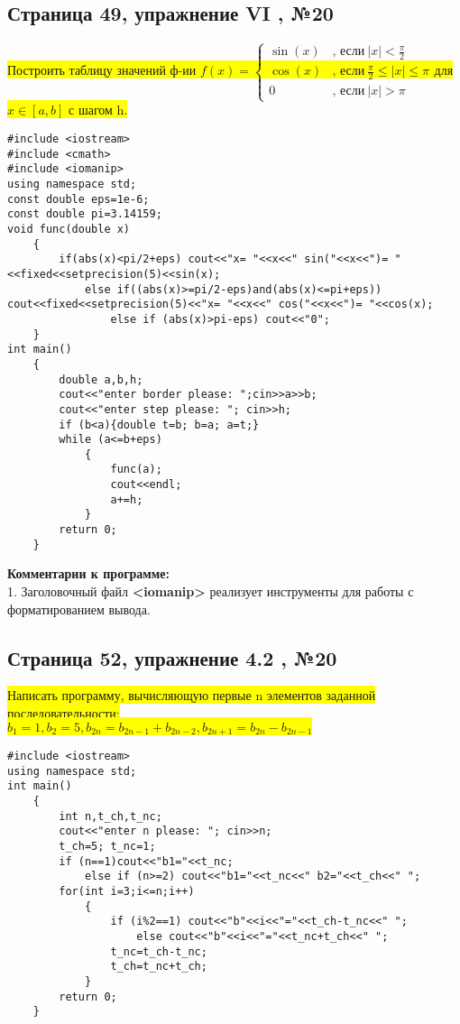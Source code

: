 \documentclass[11pt]{article}
\begin{document}
\begin{flushleft}
\newpage
\begin{center}
\section{Страница 49, упражнение VI , №20}
\colorbox{yellow}{Построить таблицу значений ф-ии $
f(x)=\left\{
\begin{array}{rl}
\sin(x) &\mbox{, если}\ |x|<\frac{\pi}{2}\\
   \cos(x)        &\mbox{, если}\ \frac{\pi}{2}\leq|x|\leq\pi\\
0 &\mbox{, если}\ |x|>\pi
\end{array}
\right.
$для $x \in [a,b]$ с шагом h.}
\end{center}
\begin{lstlisting}
#include <iostream>
#include <cmath>
#include <iomanip>
using namespace std;
const double eps=1e-6;
const double pi=3.14159;
void func(double x)
	{
		if(abs(x)<pi/2+eps) cout<<"x= "<<x<<" sin("<<x<<")= "<<fixed<<setprecision(5)<<sin(x);
			else if((abs(x)>=pi/2-eps)and(abs(x)<=pi+eps)) cout<<fixed<<setprecision(5)<<"x= "<<x<<" cos("<<x<<")= "<<cos(x);
				else if (abs(x)>pi-eps) cout<<"0";
	}
int main()
	{
		double a,b,h;
		cout<<"enter border please: ";cin>>a>>b;
		cout<<"enter step please: "; cin>>h;
		if (b<a){double t=b; b=a; a=t;} 
		while (a<=b+eps)
			{
				func(a);
				cout<<endl;
				a+=h;
			}
		return 0;
	}
\end{lstlisting}

\textbf{Комментарии к программе:} \\
1. Заголовочный файл \textbf{<iomanip>} реализует инструменты для работы с форматированием вывода.

\newpage
\begin{center}
\section{Страница 52, упражнение 4.2 , №20}
\colorbox{yellow}{Написать программу, вычисляющую первые n элементов заданной последовательности:}\\
\colorbox{yellow}{$b_1=1, b_2=5, b_{2n}=b_{2n-1}+b_{2n-2}, b_{2n+1}=b_{2n}-b_{2n-1}$}
\end{center}
\begin{lstlisting}
#include <iostream>
using namespace std;
int main()
	{
		int n,t_ch,t_nc;
		cout<<"enter n please: "; cin>>n;
		t_ch=5; t_nc=1; 
		if (n==1)cout<<"b1="<<t_nc;
			else if (n>=2) cout<<"b1="<<t_nc<<" b2="<<t_ch<<" ";
		for(int i=3;i<=n;i++)
			{
				if (i%2==1) cout<<"b"<<i<<"="<<t_ch-t_nc<<" ";
					else cout<<"b"<<i<<"="<<t_nc+t_ch<<" ";
				t_nc=t_ch-t_nc;
				t_ch=t_nc+t_ch;
			}
		return 0;
	}
\end{lstlisting}


\end{flushleft}
\end{document}
